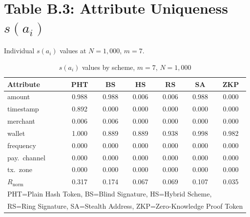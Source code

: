 \section*{Table B.3: Attribute Uniqueness $s(a_i)$}

Individual $s(a_i)$ values at $N = 1{,}000$, $m = 7$.

\begin{table}[H]
\centering
\caption{$s(a_i)$ values by scheme, $m=7$, $N=1{,}000$}
\small
\begin{tabular}{lcccccc}
\toprule
\textbf{Attribute} &
\textbf{PHT} & \textbf{BS} & \textbf{HS} &
\textbf{RS} & \textbf{SA} & \textbf{ZKP}\\
\midrule
amount              & 0.988 & 0.988 & 0.006 & 0.006 & 0.988 & 0.000\\
timestamp           & 0.892 & 0.000 & 0.000 & 0.000 & 0.000 & 0.000\\
merchant            & 0.006 & 0.006 & 0.000 & 0.000 & 0.000 & 0.000\\
wallet              & 1.000 & 0.889 & 0.889 & 0.938 & 0.998 & 0.982\\
frequency           & 0.000 & 0.000 & 0.000 & 0.000 & 0.000 & 0.000\\
pay.\ channel       & 0.000 & 0.000 & 0.000 & 0.000 & 0.000 & 0.000\\
tx.\ zone           & 0.000 & 0.000 & 0.000 & 0.000 & 0.000 & 0.000\\
\midrule
$R_{\mathrm{norm}}$ & 0.317 & 0.174 & 0.067 & 0.069 & 0.107 & 0.035\\
\bottomrule
\multicolumn{7}{l}{\footnotesize
PHT=Plain Hash Token, BS=Blind Signature,
HS=Hybrid Scheme,}\\
\multicolumn{7}{l}{\footnotesize
RS=Ring Signature, SA=Stealth Address, ZKP=Zero-Knowledge Proof Token}
\end{tabular}
\end{table}